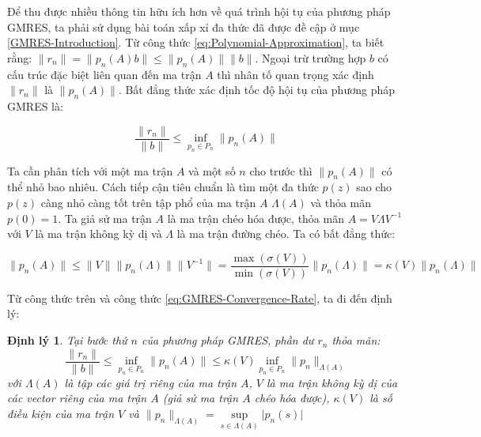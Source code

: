 \documentclass[14pt, a4paper]{article}
\numberwithin{equation}{section}
\numberwithin{algorithm}{section}
\numberwithin{figure}{section}
\newtheorem{dl}{Định lý}
\numberwithin{dl}{section}
\numberwithin{md}{section}
\numberwithin{bd}{section}
\numberwithin{dn}{section}
\begin{document}
Để thu được nhiều thông tin hữu ích hơn về quá trình hội tụ của phương pháp GMRES, ta phải sử dụng bài toán xấp xỉ đa thức đã được đề cập ở mục \ref{GMRES-Introduction}. Từ công thức \ref{eq:Polynomial-Approximation}, ta biết rằng: $\lVert r_n \rVert=\lVert p_n(A)b \rVert \leq \lVert p_n(A) \rVert \lVert b \rVert$. Ngoại trừ trường hợp $b$ có cấu trúc đặc biệt liên quan đến ma trận $A$ thì nhân tố quan trọng xác định $ \lVert r_n \rVert$ là $\lVert p_n(A) \rVert$. Bất đẳng thức xác định tốc độ hội tụ của phương pháp GMRES là:

\begin{equation} \label{eq:GMRES-Convergence-Rate}
    \dfrac{\lVert r_n \rVert}{\lVert b \rVert} \leq \inf_{p_n \in P_n} \lVert p_n(A) \rVert
\end{equation}

Ta cần phân tích với một ma trận $A$ và một số $n$ cho trước thì $\lVert p_n(A) \rVert$ có thể nhỏ bao nhiêu. Cách tiếp cận tiêu chuẩn là tìm một đa thức $p(z)$ sao cho $p(z)$ càng nhỏ càng tốt trên tập phổ của ma trận $A$ $\Lambda(A)$ và thỏa mãn $p(0)=1$. Ta giả sử ma trận $A$ là ma trận chéo hóa được, thỏa mãn $A=V\Lambda V^{-1}$ với $V$ là ma trận không kỳ dị và $\Lambda$ là ma trận đường chéo. Ta có bất đẳng thức:

\begin{equation}
    \lVert p_n(A) \rVert \leq \lVert V \rVert \lVert p_n(\Lambda) \rVert \lVert V^{-1} \rVert = \dfrac{\max(\sigma(V))}{\min(\sigma(V))} \lVert p_n(\Lambda) \rVert = \kappa(V) \lVert p_n(\Lambda) \rVert
\end{equation}

Từ công thức trên và công thức \ref{eq:GMRES-Convergence-Rate}, ta đi đến định lý:

\begin{dl} \label{dl:GMRES-Convergence-Rate}
    Tại bước thứ $n$ của phương pháp GMRES, phần dư $r_n$ thỏa mãn:
    \begin{equation}
        \dfrac{\lVert r_n \rVert}{\lVert b \rVert} \leq \inf_{p_n \in P_n} \lVert p_n(A) \rVert \leq \kappa(V) \inf_{p_n \in P_n} \lVert p_n \rVert_{\Lambda(A)}
    \end{equation}
    với $\Lambda(A)$ là tập các giá trị riêng của ma trận $A$, $V$ là ma trận không kỳ dị của các vector riêng của ma trận $A$ (giả sử ma trận $A$ chéo hóa được), $\kappa(V)$ là số điều kiện của ma trận $V$ và $\lVert p_n \rVert_{\Lambda(A)}=\underset{s \in \Lambda(A)}{\sup} \lvert p_n(s) \rvert$
\end{dl}
\end{document}

